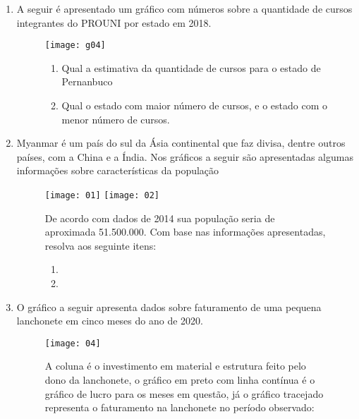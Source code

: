 \documentclass[oneside,a4paper,12pt]{article}
\begin{document}
\begin{enumerate}
\newpage
\item A seguir é apresentado um gráfico com números sobre a quantidade de cursos integrantes do PROUNI por estado em 2018.

\begin{figure}[!hbt]
\begin{multicols}{2}
\texttt{[image: g04]}

\columnbreak
\begin{enumerate}
\item Qual a estimativa da quantidade de cursos para o estado de Pernanbuco
\item Qual o estado com maior número de cursos, e o estado com o menor número de cursos.
\end{enumerate}
\end{multicols}
\end{figure}

\item Myanmar é um país do sul da Ásia continental que faz divisa, dentre outros países, com a China e  a Índia. Nos gráficos a seguir são apresentadas algumas informações sobre características da população 

\begin{figure}[!hbt]
\begin{multicols}{2}
\texttt{[image: 01]}
\texttt{[image: 02]}

De acordo com dados de 2014 sua população seria de aproximada 51.500.000. Com base nas informações apresentadas, resolva aos seguinte itens:
\begin{enumerate}
\item 

\item 
\end{enumerate}

\end{multicols}
\end{figure}

\newpage
\item O gráfico a seguir apresenta dados sobre faturamento de uma pequena lanchonete em cinco meses do ano de 2020.

\begin{figure}[!hbt]
\begin{multicols}{2}
\texttt{[image: 04]}

\columnbreak
A coluna é o investimento em material e estrutura feito pelo dono da lanchonete, o gráfico em preto com linha contínua é o gráfico de lucro para os meses em questão, já o gráfico tracejado representa o faturamento na lanchonete no período observado:


\end{multicols}
\end{figure}
\end{enumerate}
\end{document}
